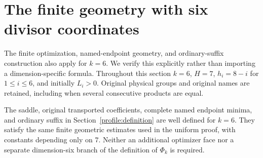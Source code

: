 \section{The finite geometry with six divisor coordinates}
\label{k6geom:section}

The finite optimization, named-endpoint geometry, and ordinary-suffix
construction also apply for $k=6$. We verify this explicitly
rather than importing a dimension-specific formula.
Throughout this section $k=6$, $H=7$, $h_i=8-i$ for $1\leq i\leq6$,
and initially $L_i>0$. Original physical groups and original names
are retained, including when several consecutive products are equal.

\begin{proposition}[Finite geometric inputs at $k=6$]
\label{k6geom:finite}
The saddle, original transported coefficients, complete named endpoint
minima, and ordinary suffix in Section~\ref{profile:definition} are
well defined for $k=6$. They satisfy the same finite geometric estimates
used in the uniform proof, with constants depending only on $7$.
Neither an additional optimizer face nor a separate dimension-six
branch of the definition of $\Phi_k$ is required.
\end{proposition}

